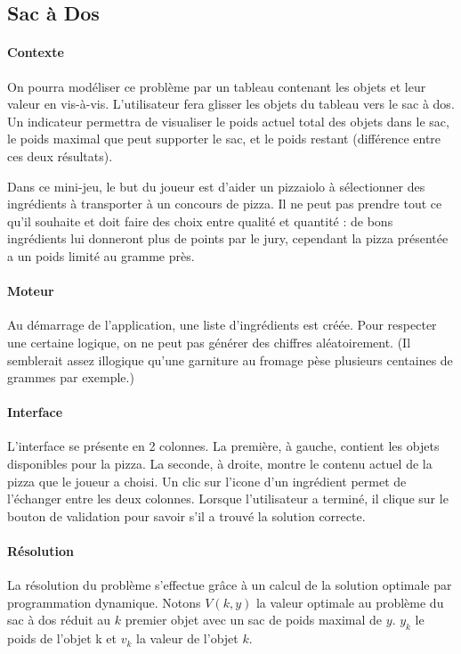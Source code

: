     \subsection{Sac à Dos}
        \paragraph{Contexte}
        On pourra modéliser ce problème par un tableau contenant les objets et leur
        valeur en vis-à-vis. L'utilisateur fera glisser les objets du tableau vers
        le sac à dos. Un indicateur permettra de visualiser le poids actuel total
        des objets dans le sac, le poids maximal que peut supporter le sac, et le
        poids restant (différence entre ces deux résultats).

            Dans ce mini-jeu, le but du joueur est d'aider un pizzaiolo à
            sélectionner des ingrédients à transporter à un concours de pizza.
            Il ne peut pas prendre tout ce qu'il souhaite et doit faire des
            choix entre qualité et quantité : de bons ingrédients lui donneront
            plus de points par le jury, cependant la pizza présentée a un poids
            limité au gramme près.
        \paragraph{Moteur}
            Au démarrage de l'application, une liste d'ingrédients est créée.
            Pour respecter une certaine logique, on ne peut pas générer des
            chiffres aléatoirement. (Il semblerait assez illogique qu'une
            garniture au fromage pèse plusieurs centaines de grammes par
            exemple.)
        \paragraph{Interface}
            L'interface se présente en 2 colonnes. La première, à gauche,
            contient les objets disponibles pour la pizza. La seconde, à droite,
            montre le contenu actuel de la pizza que le joueur a choisi.
            Un clic sur l'icone d'un ingrédient permet de l'échanger entre
            les deux colonnes.
            Lorsque l'utilisateur a terminé, il clique sur le bouton de
            validation pour savoir s'il a trouvé la solution correcte.
        \paragraph{Résolution}
            La résolution du problème s'effectue grâce à un calcul de la solution optimale
            par programmation dynamique. Notons $V(k,y)$ la valeur optimale au problème du sac à dos
            réduit au $k$ premier objet avec un sac de poids maximal de $y$.
            $y_{k}$ le poids de l'objet k et $v_{k}$ la valeur de l'objet $k$.

